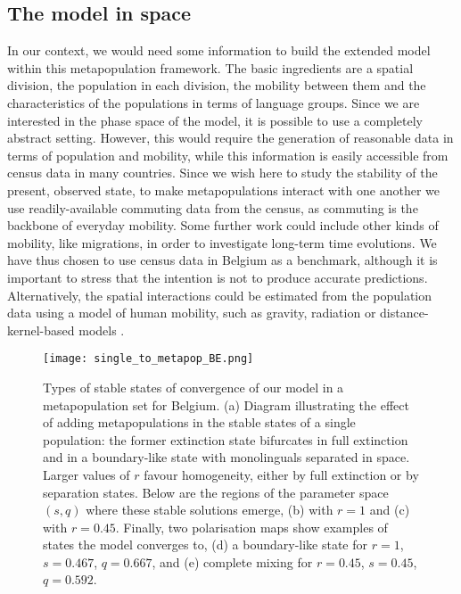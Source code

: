 \documentclass[../thesis.tex]{subfiles}
\begin{document}
\subsection{The model in space}

In our context, we would need some information to build the extended model within this
metapopulation framework. The basic ingredients are a spatial division, the population
in each division, the mobility between them and the characteristics of the populations
in terms of language groups. Since we are interested in the phase space of the model, it
is possible to use a completely abstract setting. However, this would require the
generation of reasonable data in terms of population and mobility, while this
information is easily accessible from census data in many countries. Since we wish here
to study the stability of the present, observed state, to make metapopulations interact
with one another we use readily-available commuting data from the census, as commuting
is the backbone of everyday mobility. Some further work could include other kinds of
mobility, like migrations, in order to investigate long-term time evolutions. We have
thus chosen to use census data in Belgium as a benchmark, although it is important to
stress that the intention is not to produce accurate predictions. Alternatively, the
spatial interactions could be estimated from the population data using a model of human
mobility, such as gravity, radiation or distance-kernel-based models
\cite{BarbosaHumanMobility2018,BurridgeSpatialEvolution2017,BurridgeInferringDrivers2021}.

\begin{figure}[hp!]
\centering
    \texttt{[image: single\_to\_metapop\_BE.png]}
    \caption{Types of stable states of convergence of our model in a metapopulation set
    for Belgium. (a) Diagram illustrating the effect of adding metapopulations in the
    stable states of a single population: the former extinction state bifurcates in full
    extinction and in a boundary-like state with monolinguals separated in space. Larger
    values of $r$ favour homogeneity, either by full extinction or by separation states.
    Below are the regions of the parameter space $(s,q)$ where these stable solutions
    emerge, (b) with $r=1$ and (c) with $r=0.45$. Finally, two polarisation maps show
    examples of states the model converges to, (d) a boundary-like state for $r=1$,
    $s=0.467$, $q=0.667$, and (e) complete mixing for $r=0.45$, $s=0.45$, $q=0.592$.}
    \label{fig:single_to_metapop_BE}
\end{figure}
\end{document}
